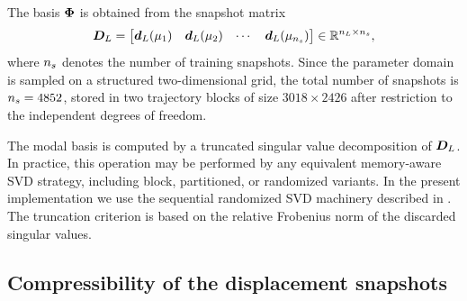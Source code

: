 \documentclass[11pt,a4paper]{article}
\begin{document}
The basis $\bm{\Phi}$ is obtained from the snapshot matrix
\begin{equation}
\label{eq:Dmatrix}
    \bm{D}_L =
    \begin{bmatrix}
    \bm{d}_L(\mu_1) & \bm{d}_L(\mu_2) & \cdots & \bm{d}_L(\mu_{n_s})
    \end{bmatrix}
    \in\mathbb{R}^{n_L\times n_s},
\end{equation}
where $n_s$ denotes the number of training snapshots. Since the parameter domain is
sampled on a structured two-dimensional grid, the total number of snapshots is
$n_s=4852$, stored in two trajectory blocks of size $3018\times2426$ after restriction to
the independent degrees of freedom.

The modal basis is computed by a truncated singular value decomposition of $\bm{D}_L$.
In practice, this operation may be performed by any equivalent memory-aware SVD strategy,
including block, partitioned, or randomized variants. In the present implementation we use the
sequential randomized SVD machinery described in \cite{hernandez2024cecm}. The truncation
criterion is based on the relative Frobenius norm of the discarded singular values.


\subsection{Compressibility of the displacement snapshots}
\label{subsec:standard_ROM_compressibility}
\end{document}
